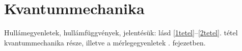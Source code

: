  \section{Kvantummechanika}
  
  Hullámegyenletek, hullámfüggvények, jelentésük: lásd \ref{1tetel}--\ref{2tetel}. tétel kvantummechanika része, illetve a mérlegegyenletek . fejezetben.
